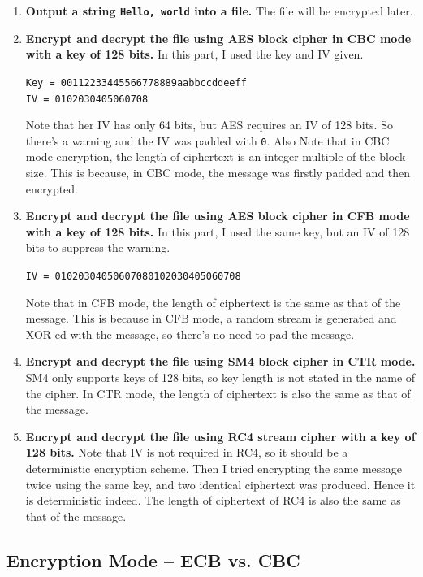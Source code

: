 \begin{enumerate}[label=(\arabic*)]
\item {
    \textbf{Output a string \texttt{Hello, world} into a file.} 
    The file will be encrypted later.
}
\item {
    \textbf{Encrypt and decrypt the file using AES block cipher in CBC mode with a key of 128 bits.} 
    In this part, I used the key and IV given.
    \begin{center}
        \texttt{Key = 00112233445566778889aabbccddeeff} \\
        \texttt{IV  = 0102030405060708}
    \end{center}
    Note that her IV has only 64 bits, but AES requires an IV of 128 bits. So there's a warning and the IV was padded with \texttt{0}. 
    Also Note that in CBC mode encryption, the length of ciphertext is an integer multiple of the block size. This is because, in CBC mode, the message was firstly padded and then encrypted.
}
\item {
    \textbf{Encrypt and decrypt the file using AES block cipher in CFB mode with a key of 128 bits. }
    In this part, I used the same key, but an IV of 128 bits to suppress the warning.
    \begin{center}
        \texttt{IV  = 01020304050607080102030405060708}
    \end{center}
    Note that in CFB mode, the length of ciphertext is the same as that of the message. This is because in CFB mode, a random stream is generated and XOR-ed with the message, so there's no need to pad the message.   
}
\item {
    \textbf{Encrypt and decrypt the file using SM4 block cipher in CTR mode.}
    SM4 only supports keys of 128 bits, so key length is not stated in the name of the cipher.
    In CTR mode, the length of ciphertext is also the same as that of the message.
}
\item {
    \textbf{Encrypt and decrypt the file using RC4 stream cipher with a key of 128 bits.}
    Note that IV is not required in RC4, so it should be a deterministic encryption scheme. Then I tried encrypting the same message twice using the same key, and two identical ciphertext was produced. Hence it is deterministic indeed.
    The length of ciphertext of RC4 is also the same as that of the message.
}
\end{enumerate}

\subsection{Encryption Mode – ECB vs. CBC}

